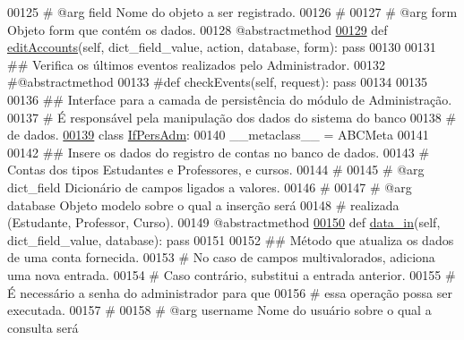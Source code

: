 \begin{DoxyCode}
00125     \textcolor{comment}{#   @arg field      Nome do objeto a ser registrado.}
00126     \textcolor{comment}{#}
00127     \textcolor{comment}{#   @arg form       Objeto form que contém os dados.}
00128     @abstractmethod
\hypertarget{AdmUnit_8py_source_l00129}{}\hyperlink{classAdm_1_1AdmUnit_1_1IfBusAdm_a01c6dd1137af994627462fab498b56e7}{00129}     \textcolor{keyword}{def }\hyperlink{classAdm_1_1AdmUnit_1_1IfBusAdm_a01c6dd1137af994627462fab498b56e7}{editAccounts}(self, dict\_field\_value, action, database, form): \textcolor{keyword}{pass}
00130 
00131     \textcolor{comment}{## Verifica os últimos eventos realizados pelo Administrador.}
00132     \textcolor{comment}{#@abstractmethod}
00133     \textcolor{comment}{#def checkEvents(self, request): pass}
00134     
00135 
00136 \textcolor{comment}{## Interface para a camada de persistência do módulo de Administração.}
00137 \textcolor{comment}{#   É responsável pela manipulação dos dados do sistema do banco}
00138 \textcolor{comment}{#   de dados.}
\hypertarget{AdmUnit_8py_source_l00139}{}\hyperlink{classAdm_1_1AdmUnit_1_1IfPersAdm}{00139} \textcolor{keyword}{class }\hyperlink{classAdm_1_1AdmUnit_1_1IfPersAdm}{IfPersAdm}:
00140     \_\_metaclass\_\_ = ABCMeta
00141 
00142     \textcolor{comment}{## Insere os dados do registro de contas no banco de dados.}
00143     \textcolor{comment}{#   Contas dos tipos Estudantes e Professores, e cursos.}
00144     \textcolor{comment}{#}
00145     \textcolor{comment}{#   @arg    dict\_field  Dicionário de campos ligados a valores.}
00146     \textcolor{comment}{#}
00147     \textcolor{comment}{#   @arg    database    Objeto modelo sobre o qual a inserção será}
00148     \textcolor{comment}{#                       realizada (Estudante, Professor, Curso). }
00149     @abstractmethod
\hypertarget{AdmUnit_8py_source_l00150}{}\hyperlink{classAdm_1_1AdmUnit_1_1IfPersAdm_abf01de08eb9d6517cdcb44321ea12ce7}{00150}     \textcolor{keyword}{def }\hyperlink{classAdm_1_1AdmUnit_1_1IfPersAdm_abf01de08eb9d6517cdcb44321ea12ce7}{data\_in}(self, dict\_field\_value, database): \textcolor{keyword}{pass}
00151 
00152     \textcolor{comment}{## Método que atualiza os dados de uma conta fornecida.}
00153     \textcolor{comment}{#   No caso de campos multivalorados, adiciona uma nova entrada.}
00154     \textcolor{comment}{#   Caso contrário, substitui a entrada anterior.}
00155     \textcolor{comment}{#   É necessário a senha do administrador para que}
00156     \textcolor{comment}{#   essa operação possa ser executada.}
00157     \textcolor{comment}{#}
00158     \textcolor{comment}{#   @arg    username    Nome do usuário sobre o qual a consulta será}

\end{DoxyCode}
